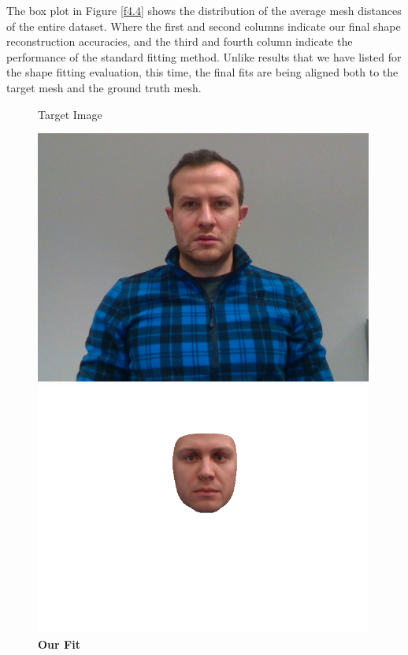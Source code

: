 The box plot in Figure \ref{f4.4} shows the distribution of the average mesh distances of the entire dataset. Where the first and second columns indicate our final shape reconstruction accuracies, and the third and fourth column indicate the performance of the standard fitting method. Unlike results that we have listed for the shape fitting evaluation, this time, the final fits are being aligned both to the target mesh and the ground truth mesh. 

\begin{figure}[h]
    \centering
    \begin{minipage}{.325\textwidth}
      \centering
      \caption*{Target Image}
      \includegraphics[width=0.99\textwidth]{Figures/dataset/target/1.png}
    \end{minipage}
    \begin{minipage}{.325\textwidth}
      \centering
      \caption*{\textbf{Our Fit}}
      \includegraphics[width=0.99\textwidth]{Figures/dataset/our/1.png}

\end{minipage}
\end{figure}

